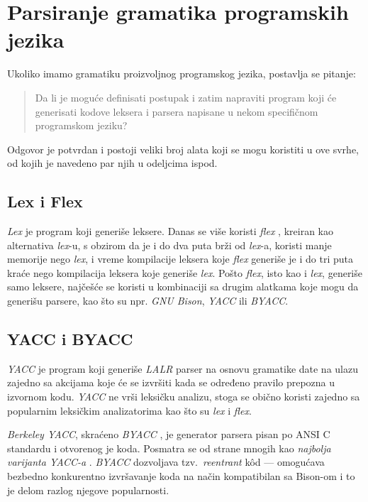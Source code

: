 \section{Parsiranje gramatika programskih jezika}
\label{sec:ParsingGrammars}

Ukoliko imamo gramatiku proizvoljnog programskog jezika, postavlja se pitanje: 
\begin{quote}
    Da li je moguće definisati postupak i zatim napraviti program koji će generisati kodove leksera i parsera napisane u nekom specifičnom programskom jeziku?
\end{quote}
Odgovor je potvrdan i postoji veliki broj alata koji se mogu koristiti u ove svrhe, od kojih je navedeno par njih u odeljcima ispod.

\subsection{Lex i Flex}
\label{subsec:LexFlex}
\emph{Lex} \cite{LexYacc} je program koji generiše leksere. Danas se više koristi \emph{flex} \cite{Flex}, kreiran kao alternativa \emph{lex}-u, s obzirom da je i do dva puta brži od \emph{lex}-a, koristi manje memorije nego \emph{lex}, i vreme kompilacije leksera koje \emph{flex} generiše je i do tri puta kraće nego kompilacija leksera koje generiše \emph{lex}. Pošto \emph{flex}, isto kao i \emph{lex}, generiše samo leksere, najčešće se koristi u kombinaciji sa drugim alatkama koje mogu da generišu parsere, kao što su npr. \emph{GNU Bison}, \emph{YACC} ili \emph{BYACC}.

\subsection{YACC i BYACC}
\label{subsec:BYACC}
\emph{YACC} \cite{LexYacc} je program koji generiše \emph{LALR} \cite{DragonBook} parser na osnovu gramatike date na ulazu zajedno sa akcijama koje će se izvršiti kada se određeno pravilo prepozna u izvornom kodu. \emph{YACC} ne vrši leksičku analizu, stoga se obično koristi zajedno sa popularnim leksičkim analizatorima kao što su \emph{lex} i \emph{flex}. 

\emph{Berkeley YACC}, skraćeno \emph{BYACC} \cite{BYACC}, je generator parsera pisan po ANSI C standardu i otvorenog je koda. Posmatra se od strane mnogih kao \textit{najbolja varijanta YACC-a} \cite{LexYacc}. \emph{BYACC} dozvoljava tzv.~\emph{reentrant} k\^od --- omogućava bezbedno konkurentno izvršavanje koda na način kompatibilan sa Bison-om i to je delom razlog njegove popularnosti.

